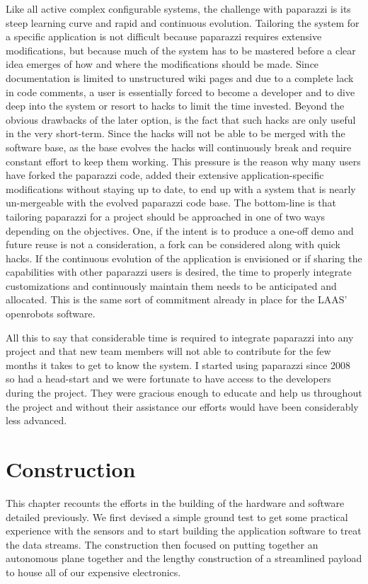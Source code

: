 \documentclass[a4paper,11pt]{report}
\begin{document}
Like all active complex configurable systems, the challenge with paparazzi is its steep learning curve and rapid and continuous evolution. Tailoring the system for a specific application is not difficult because paparazzi requires extensive modifications, but because much of the system has to be mastered before a clear idea emerges of how and where the modifications should be made. Since documentation is limited to unstructured wiki pages and due to a complete lack in code comments, a user is essentially forced to become a developer and to dive deep into the system or resort to hacks to limit the time invested. Beyond the obvious drawbacks of the later option, is the fact that such hacks are only useful in the very short-term. Since the hacks will not be able to be merged with the software base, as the base evolves the hacks will continuously break and require constant effort to keep them working. This pressure is the reason why many users have forked the paparazzi code, added their extensive application-specific modifications without staying up to date, to end up with a system that is nearly un-mergeable with the evolved paparazzi code base. The bottom-line is that tailoring paparazzi for a project should be approached in one of two ways depending on the objectives. One, if the intent is to produce a one-off demo and future reuse is not a consideration, a fork can be considered along with quick hacks. If the continuous evolution of the application is envisioned or if sharing the capabilities with other paparazzi users is desired, the time to properly integrate customizations and continuously maintain them needs to be anticipated and allocated. This is the same sort of commitment already in place for the LAAS' openrobots software.

All this to say that considerable time is required to integrate paparazzi into any project and that new team members will not able to contribute for the few months it takes to get to know the system. I started using paparazzi since 2008 so had a head-start and we were fortunate to have access to the developers during the project. They were gracious enough to educate and help us throughout the project and without their assistance our efforts would have been considerably less advanced.

\chapter{Construction}

This chapter recounts the efforts in the building of the hardware and software detailed previously. We first devised a simple ground test to get some practical experience with the sensors and to start building the application software to treat the data streams. The construction then focused on putting together an autonomous plane together and the lengthy construction of a streamlined payload to house all of our expensive electronics.
\end{document}
